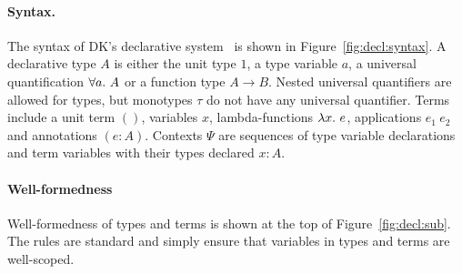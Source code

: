 \paragraph{Syntax.}
The syntax of DK's declarative system~\cite{dunfield2013complete} is shown in Figure~\ref{fig:decl:syntax}.
A declarative type $A$ is either the unit type $1$, a type variable $a$,
a universal quantification $\all A$ or a function type $A \to B$.
Nested universal quantifiers are allowed for types,
but monotypes $\tau$ do not have any universal quantifier.
Terms include a unit term $()$, variables $x$, lambda-functions $\lam e$,
applications $e_1~e_2$ and annotations $(e:A)$.
Contexts $\Psi$ are sequences of type variable declarations and
term variables with their types declared $x:A$.

\paragraph{Well-formedness} Well-formedness of types and terms is 
shown at the top of Figure~\ref{fig:decl:sub}. The rules are standard
and simply ensure that variables in types and terms are well-scoped.  

